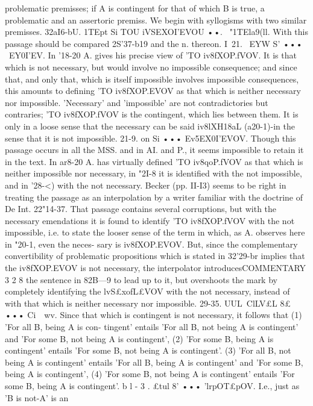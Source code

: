 {{{{problematic premisses; if A is contingent for that of which B is
true, a problematic and an assertoric premiss. We begin with
syllogisms with two similar premisses.
32aI6-bU. 1TEpt Si TOU iVSEXOI'EVOU ••. ~"1TEla9(ll. With this
passage should be compared 2S'37-b19 and the n. thereon.
I~21. ~EYW S' ••• ~EY0I'EV. In '18-20 A. gives his precise view
of 'TO iv8fXOP.fVOV. It is that which is not necessary, but would
involve no impossible consequence; and since that, and only
that, which is itself impossible involves impossible consequences,
this amounts to defining 'TO iv8fXOP.EVOV as that which is neither
necessary nor impossible. 'Necessary' and 'impossible' are not
contradictories but contraries; 'TO iv8fXOP.fVOV is the contingent,
which lies between them. It is only in a loose sense that the
necessary can be said iv8lXH18aL (a20-1)-in the sense that it is
not impossible.
21-9. on Si ••• Ev5EX0I'EVOV. Though this passage occurs in
all the MSS. and in AI. and P., it seems impossible to retain it in
the text. In ar8-20 A. has virtually defined 'TO iv8qoP.fVOV as
that which is neither impossible nor necessary, in "2I-8 it is
identified with the not impossible, and in '28-<) with the not
necessary. Becker (pp. II-I3) seems to be right in treating the
passage as an interpolation by a writer familiar with the doctrine
of De Int. 22"14-37. That passage contains several corruptions,
but with the necessary emendations it is found to identify 'TO
iv8fXOP.fVOV with the not impossible, i.e. to state the looser sense
of the term in which, as A. observes here in "20-1, even the neces-
sary is iv8fXOP.EVOV. But, since the complementary convertibility
of problematic propositions which is stated in 32'29-br implies
that the iv8fXOP.EVOV is not necessary, the interpolator introducesCOMMENTARY
3 2 8
the sentence in 82B---9 to lead up to it, but overshoots the mark by
completely identifying the lvS£xofL£VOV with the not necessary,
instead of with that which is neither necessary nor impossible.
29-35. UU\-L~ClLV£L 8£ ••• Ci~~wv. Since that which is contingent
is not necessary, it follows that (1) 'For all B, being A is con-
tingent' entails 'For all B, not being A is contingent' and 'For
some B, not being A is contingent', (2) 'For some B, being A is
contingent' entails 'For some B, not being A is contingent'.
(3) 'For all B, not being A is contingent' entails 'For all B, being
A is contingent' and 'For some B, being A is contingent', (4)
'For some B, not being A is contingent' entails 'For some B,
being A is contingent'.
b l - 3 . £tul 8' ••• 'lrpOT£pOV. I.e., just as 'B is not-A' is an
}}}}
